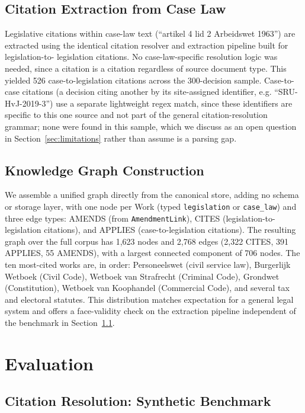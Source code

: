 \documentclass{IOS-Book-Article}
\begin{document}
\subsection{Citation Extraction from Case Law}

Legislative citations within case-law text (``artikel 4 lid 2 Arbeidswet 1963'') are extracted
using the identical citation resolver and extraction pipeline built for legislation-to-
legislation citations. No case-law-specific resolution logic was needed, since a citation is
a citation regardless of source document type. This yielded 526 case-to-legislation
citations across the 300-decision sample. Case-to-case citations (a decision citing another
by its site-assigned identifier, e.g. ``SRU-HvJ-2019-3'') use a separate lightweight regex
match, since these identifiers are specific to this one source and not part of the general
citation-resolution grammar; none were found in this sample, which we discuss as an open
question in Section~\ref{sec:limitations} rather than assume is a parsing gap.

\subsection{Knowledge Graph Construction}

We assemble a unified graph directly from the canonical store, adding no schema or
storage layer, with one node per Work (typed \texttt{legislation} or \texttt{case\_law}) and three edge
types: AMENDS (from \texttt{AmendmentLink}), CITES (legislation-to-legislation citations), and
APPLIES (case-to-legislation citations). The resulting graph over the full corpus has
1,623 nodes and 2,768 edges (2,322 CITES, 391 APPLIES, 55 AMENDS), with a largest connected
component of 706 nodes. The ten most-cited works are, in order: Personeelswet (civil service
law), Burgerlijk Wetboek (Civil Code), Wetboek van Strafrecht (Criminal Code), Grondwet
(Constitution), Wetboek van Koophandel (Commercial Code), and several tax and electoral
statutes. This distribution matches expectation for a general legal system and offers a
face-validity check on the extraction pipeline independent of the benchmark in Section~\ref{sec:resolver-eval}.

\section{Evaluation}
\label{sec:eval}

\subsection{Citation Resolution: Synthetic Benchmark}
\label{sec:resolver-eval}
\end{document}
